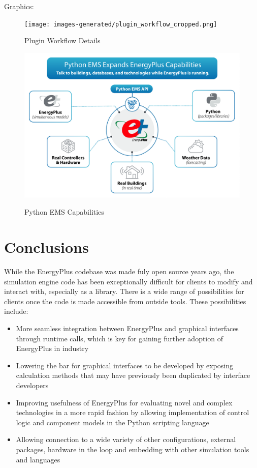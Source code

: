 \documentclass[5p]{elsarticle}
\begin{document}
Graphics:

\begin{figure}
\begin{center}
\label{figure:plugins:plugin_workflow_cropped}
\texttt{[image: images-generated/plugin\_workflow\_cropped.png]}
\caption{Plugin Workflow Details}
\end{center}
\end{figure}

\begin{figure}
\begin{center}
\label{figure:plugins:python_ems}
\includegraphics[width=\columnwidth]{images/python_ems.png}
\caption{Python EMS Capabilities}
\end{center}
\end{figure}

 \section{Conclusions}
While the EnergyPlus codebase was made fuly open source years ago, the simulation engine code has been exceptionally difficult for clients to modify and interact with, especially as a library.  There is a wide range of possibilities for clients once the code is made accessible from outside tools.  These possibilities include:

\begin{itemize}
 \item More seamless integration between EnergyPlus and graphical interfaces through runtime calls, which is key for gaining further adoption of EnergyPlus in industry
 \item Lowering the bar for graphical interfaces to be developed by exposing calculation methods that may have previously been duplicated by interface developers
 \item Improving usefulness of EnergyPlus for evaluating novel and complex technologies in a more rapid fashion by allowing implementation of control logic and component models in the Python scripting language
 \item Allowing connection to a wide variety of other configurations, external packages, hardware in the loop and embedding with other simulation tools and languages
\end{itemize}
\end{document}

